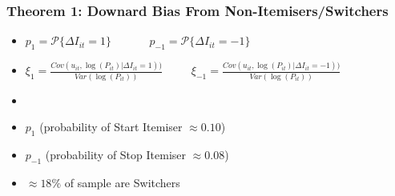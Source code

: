 \documentclass[options]{beamer}
\begin{document}
\begin{frame}
	\frametitle{Theorem 1: Downard Bias From Non-Itemisers/Switchers}

	\begin{itemize}
	\centering
	\item[] 	$p_{1}=$$\mathcal{P}$$\{\Delta I_{it}=1\}$ $\;\;\;\;\;\;\;\;\;\;\;p_{-1}=$$\mathcal{P}$$\{\Delta I_{it}=-1\}$ \vspace{10pt}
	\item[] $\xi_1=\frac{Cov(u_{it},\log(P_{it})|\Delta I_{it}=1))}{Var(\log(P_{it}))}$ $\;\;\;\;\;\;\;\;\xi_{-1}=\frac{Cov(u_{it},\log(P_{it})|\Delta I_{it}=-1))}{Var(\log(P_{it}))}$

	\vspace{25pt}
\item[]	
		
\vspace{25pt}
\item $p_1$ (probability of Start Itemiser $\approx 0.10$)	
\item $p_{-1}$	 (probability of Stop Itemiser $\approx 0.08$)
\item[]  $\approx 18\%$ of sample are Switchers





\end{itemize}

\end{frame}
\end{document}

